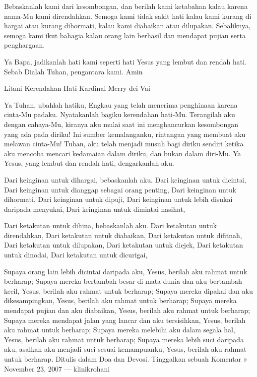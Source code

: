 \documentclass[a5paper,headsepline,titlepage,11pt,nnormalheadings,DIVcalc]{scrbook}
\begin{document}
Bebaskanlah kami dari kesombongan, dan berilah kami ketabahan kalau karena nama-Mu kami direndahkan. Semoga kami tidak sakit hati kalau kami kurang di hargai atau kurang dihormati, kalau kami diabaikan atau dilupakan. Sebaliknya, semoga kami ikut bahagia kalau orang lain berhasil dan mendapat pujian serta penghargaan.

Ya Bapa, jadikanlah hati kami seperti hati Yesus yang lembut dan rendah hati. Sebab Dialah Tuhan, pengantara kami. Amin

Litani Kerendahan Hati
Kardinal Merry dei Vai

Ya Tuhan, ubahlah hatiku, Engkau yang telah menerima penghinaan karena cinta-Mu padaku. Nyatakanlah bagiku kerendahan hati-Mu. Terangilah aku dengan cahaya-Mu, kiranya aku mulai saat ini menghancurkan kesombongan yang ada pada diriku! Ini sumber kemalanganku, rintangan yang membuat aku melawan cinta-Mu! Tuhan, aku telah menjadi musuh bagi diriku sendiri ketika aku mencoba mencari kedamaian dalam diriku, dan bukan dalam diri-Mu. Ya Yesus, yang lembut dan rendah hati, dengarkanlah aku.

Dari keinginan untuk dihargai, bebaskanlah aku.
Dari keinginan untuk dicintai,
Dari keinginan untuk dianggap sebagai orang penting,
Dari keinginan untuk dihormati,
Dari keinginan untuk dipuji,
Dari keinginan untuk lebih disukai daripada menyukai,
Dari keinginan untuk dimintai nasihat,

Dari ketakutan untuk dihina, bebaskanlah aku.
Dari ketakutan untuk direndahkan,
Dari ketakutan untuk diabaikan,
Dari ketakutan untuk difitnah,
Dari ketakutan untuk dilupakan,
Dari ketakutan untuk diejek,
Dari ketakutan untuk dinodai,
Dari ketakutan untuk dicurigai,

Supaya orang lain lebih dicintai daripada aku, Yesus, berilah aku rahmat untuk berharap;
Supaya mereka bertambah besar di mata dunia dan aku bertambah kecil, Yesus, berilah aku rahmat untuk berharap;
Supaya mereka dipakai dan aku dikesampingkan, Yesus, berilah aku rahmat untuk berharap;
Supaya mereka mendapat pujian dan aku diabaikan, Yesus, berilah aku rahmat untuk berharap;
Supaya mereka mendapat jalan yang lancar dan aku tersisihkan, Yesus, berilah aku rahmat untuk berharap;
Supaya mereka melebihi aku dalam segala hal, Yesus, berilah aku rahmat untuk berharap;
Supaya mereka lebih suci daripada aku, asalkan aku menjadi suci sesuai kemampuanku, Yesus, berilah aku rahmat untuk berharap.
Ditulis dalam Doa dan Devosi. Tinggalkan sebuah Komentar »
November 23, 2007 — klinikrohani
\end{document}
